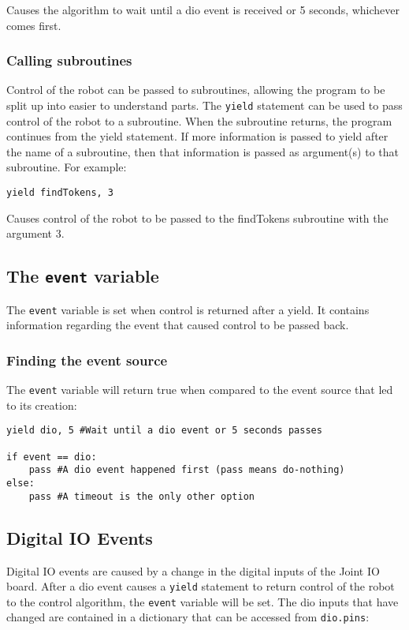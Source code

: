\documentclass{article}
\begin{document}
Causes the algorithm to wait until a dio event is received or 5 seconds,
whichever comes first.

\subsubsection{Calling subroutines}
Control of the robot can be passed to subroutines, allowing the program to be
split up into easier to understand parts.  The \texttt{yield} statement can be
used to pass control of the robot to a subroutine.  When the subroutine returns,
the program continues from the yield statement.  If more information is
passed to yield after the name of a subroutine, then that information is passed
as argument(s) to that subroutine.  For example:

\begin{verbatim}
yield findTokens, 3
\end{verbatim}

Causes control of the robot to be passed to the findTokens subroutine with the
argument 3.

\subsection{The \texttt{event} variable}
The \texttt{event} variable is set when control is returned after a
yield. It contains information regarding the event that caused control
to be passed back.

\subsubsection{Finding the event source}
The \texttt{event} variable will return true when compared to the
event source that led to its creation:

\begin{verbatim}
yield dio, 5 #Wait until a dio event or 5 seconds passes

if event == dio:
    pass #A dio event happened first (pass means do-nothing)
else:
    pass #A timeout is the only other option
\end{verbatim}

\subsection{Digital IO Events}
Digital IO events are caused by a change in the digital inputs of the
Joint IO board. After a dio event causes a \texttt{yield} statement to
return control of the robot to the control algorithm, the
\texttt{event} variable will be set. The dio inputs that have changed
are contained in a dictionary that can be accessed from \texttt{dio.pins}: 
\end{document}
